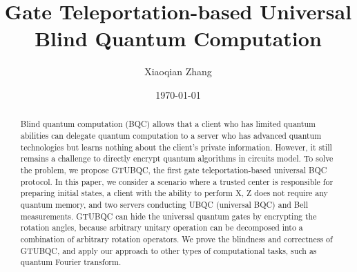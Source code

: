 \documentclass[aps,pra,showpacs,twocolumn,superscriptaddress]{revtex4-1}
\begin{document}
\title{Gate Teleportation-based Universal Blind Quantum Computation}
\author{Xiaoqian Zhang}

\date{\today}


\begin{abstract}
  Blind quantum computation (BQC) allows that a client who has limited quantum abilities can delegate quantum computation to a server who has advanced quantum technologies but learns nothing about the client's private information. However, it still remains a challenge to directly encrypt quantum algorithms in circuits model. To solve the problem, we propose GTUBQC, the first gate teleportation-based universal BQC protocol. In this paper, we consider a scenario where a trusted center is responsible for preparing initial states, a client with the ability to perform X, Z does not require any quantum memory, and two servers conducting UBQC (universal BQC) and Bell measurements. GTUBQC can hide the universal quantum gates by encrypting the rotation angles, because arbitrary unitary operation can be decomposed into a combination of arbitrary rotation operators. We prove the blindness and correctness of GTUBQC, and apply our approach to other types of computational tasks, such as quantum Fourier transform.
\end{abstract}

\maketitle
\end{document}
